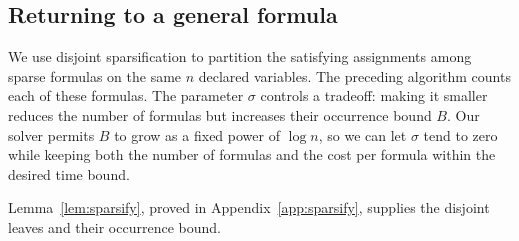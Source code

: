 \subsection{Returning to a general formula}\label{subsec:general-reduction}

We use disjoint sparsification to partition the satisfying
assignments among sparse formulas on the same $n$ declared
variables. The preceding algorithm counts each of these formulas.
The parameter $\sigma$ controls a tradeoff: making it smaller reduces
the number of formulas but increases their occurrence bound $B$.
Our solver permits $B$ to grow as a fixed power of $\log n$, so we
can let $\sigma$ tend to zero while keeping both the number of
formulas and the cost per formula within the desired time bound.

Lemma~\ref{lem:sparsify}, proved in Appendix~\ref{app:sparsify},
supplies the disjoint leaves and their occurrence bound.


